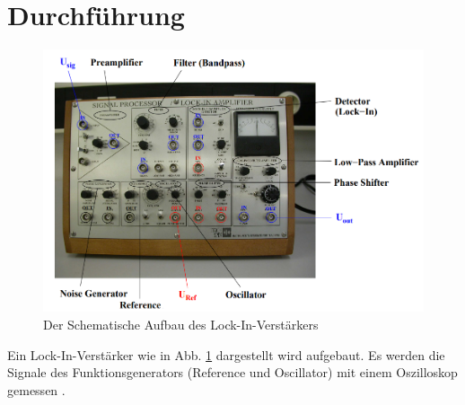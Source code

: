 \section{Durchführung}

\begin{figure}
    \includegraphics[width=\textwidth]{Abbildungen/Aufbau.png}
    \caption{Der Schematische Aufbau des Lock-In-Verstärkers \cite[][]{man:v303}}
    \label{fig:Lock-In-Bild}
\end{figure}
Ein Lock-In-Verstärker wie in Abb. \ref{fig:Lock-In-Bild} dargestellt wird aufgebaut.
Es werden die Signale des Funktionsgenerators (Reference und Oscillator) mit einem Oszilloskop gemessen \cite[][]{man:303}.

